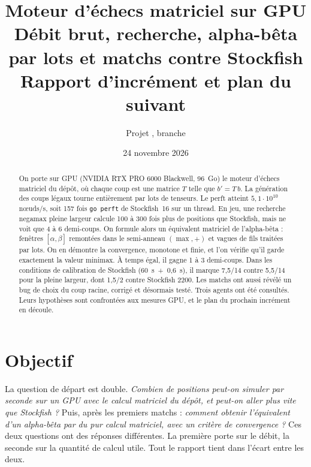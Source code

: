 \documentclass[11pt,a4paper]{article}
\title{Moteur d'échecs matriciel sur GPU\\[2pt]
\large Débit brut, recherche, alpha-bêta par lots et matchs contre Stockfish\\
\normalsize Rapport d'incrément et plan du suivant}
\author{Projet \code{chess-gpu}, branche \code{claude/zen-pasteur-vjg9yx}}
\date{24 novembre 2026}
\newcommand{\code}[1]{\texttt{#1}}
\begin{document}
\maketitle

\begin{abstract}
On porte sur GPU (NVIDIA RTX PRO 6000 Blackwell, 96~Go) le moteur d'échecs matriciel du dépôt,
où chaque coup est une matrice $T$ telle que $b' = T\,b$. La génération des coups légaux tourne
entièrement par lots de tenseurs. Le perft atteint $5{,}1\cdot 10^{10}$ nœuds/s, soit 157 fois
\code{go perft} de Stockfish~16 sur un thread. En jeu, une recherche negamax pleine largeur
calcule 100 à 300 fois plus de positions que Stockfish, mais ne voit que 4 à 6 demi-coups. On
formule alors un équivalent matriciel de l'alpha-bêta : fenêtres $[\alpha,\beta]$ remontées dans
le semi-anneau $(\max,+)$ et vagues de fils traitées par lots. On en démontre la convergence,
monotone et finie, et l'on vérifie qu'il garde exactement la valeur minimax. À temps égal, il
gagne 1 à 3 demi-coups. Dans les conditions de calibration de Stockfish (60~s~+~0{,}6~s), il
marque 7{,}5/14 contre 5{,}5/14 pour la pleine largeur, dont 1{,}5/2 contre Stockfish 2200. Les
matchs ont aussi révélé un bug de choix du coup racine, corrigé et désormais testé. Trois agents
ont été consultés. Leurs hypothèses sont confrontées aux mesures GPU, et le plan du prochain
incrément en découle.
\end{abstract}

\tableofcontents

\section{Objectif}
La question de départ est double. \emph{Combien de positions peut-on simuler par seconde sur un
GPU avec le calcul matriciel du dépôt, et peut-on aller plus vite que Stockfish ?} Puis, après
les premiers matchs : \emph{comment obtenir l'équivalent d'un alpha-bêta par du pur calcul
matriciel, avec un critère de convergence ?} Ces deux questions ont des réponses différentes. La
première porte sur le débit, la seconde sur la quantité de calcul utile. Tout le rapport tient
dans l'écart entre les deux.
\end{document}
